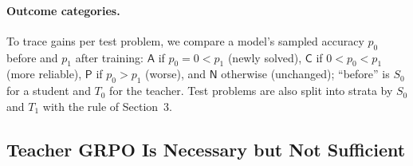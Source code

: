 \documentclass[10pt]{article}
\newcommand{\tA}{\mathsf{A}}
\newcommand{\tC}{\mathsf{C}}
\newcommand{\tP}{\mathsf{P}}
\newcommand{\tN}{\mathsf{N}}
\begin{document}
\paragraph{Outcome categories.} To trace gains per test problem, we compare a
model's sampled accuracy $p_0$ before and $p_1$ after training: $\tA$ if
$p_0=0<p_1$ (newly solved), $\tC$ if $0<p_0<p_1$ (more reliable), $\tP$ if
$p_0>p_1$ (worse), and $\tN$ otherwise (unchanged); ``before'' is $S_0$ for a
student and $T_0$ for the teacher. Test problems are also split into strata by
$S_0$ and $T_1$ with the rule of Section~3.

\subsection{Teacher GRPO Is Necessary but Not Sufficient}
\label{sec:exp-main}
\end{document}
